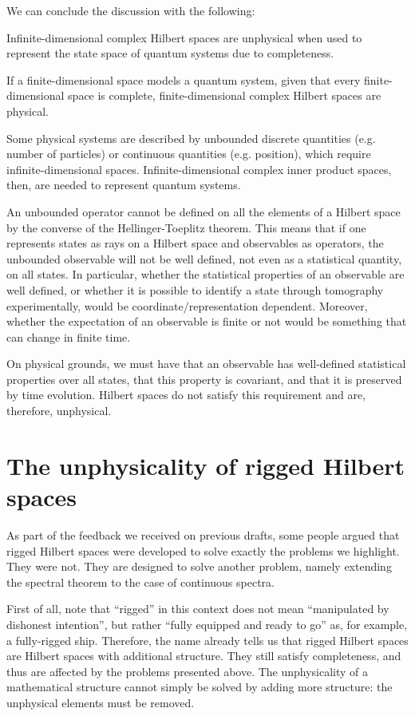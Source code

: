 \documentclass[10pt,twocolumn, nofootinbib]{revtex4-2}
\begin{document}
We can conclude the discussion with the following:
\begin{prop}
Infinite-dimensional complex Hilbert spaces are unphysical when used to represent the state space of quantum systems due to completeness.
\end{prop}
\begin{justification}
If a finite-dimensional space models a quantum system, given that every finite-dimensional space is complete, finite-dimensional complex Hilbert spaces are physical.

Some physical systems are described by unbounded discrete quantities (e.g. number of particles) or continuous quantities (e.g. position), which require infinite-dimensional spaces. Infinite-dimensional complex inner product spaces, then, are needed to represent quantum systems.

An unbounded operator cannot be defined on all the elements of a Hilbert space by the converse of the Hellinger-Toeplitz theorem. This means that if one represents states as rays on a Hilbert space and observables as operators, the unbounded observable will not be well defined, not even as a statistical quantity, on all states. In particular, whether the statistical properties of an observable are well defined, or whether it is possible to identify a state through tomography experimentally, would be coordinate/representation dependent. Moreover, whether the expectation of an observable is finite or not would be something that can change in finite time.

On physical grounds, we must have that an observable has well-defined statistical properties over all states, that this property is covariant, and that it is preserved by time evolution. Hilbert spaces do not satisfy this requirement and are, therefore, unphysical.
\end{justification}

\section{The unphysicality of rigged Hilbert spaces}

As part of the feedback we received on previous drafts, some people argued that rigged Hilbert spaces were developed to solve exactly the problems we highlight. They were not. They are designed to solve another problem, namely extending the spectral theorem to the case of continuous spectra.\cite{Madrid_2005, reed_methods_1980, Landsman2017}

First of all, note that ``rigged'' in this context does not mean ``manipulated by dishonest intention'', but rather ``fully equipped and ready to go'' as, for example, a fully-rigged ship. Therefore, the name already tells us that rigged Hilbert spaces are Hilbert spaces with additional structure. They still satisfy completeness, and thus are affected by the problems presented above. The unphysicality of a mathematical structure cannot simply be solved by adding more structure: the unphysical elements must be removed.
\end{document}
